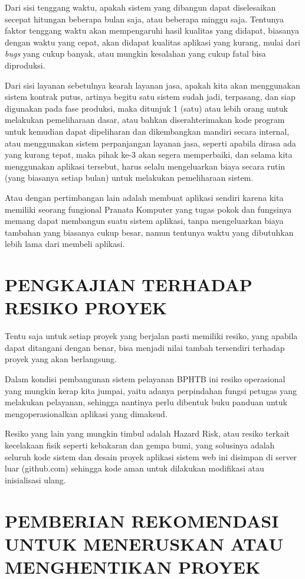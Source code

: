 \documentclass[pdftex,12pt, oneside]{article}
\begin{document}
Dari sisi tenggang waktu, apakah sistem yang dibangun dapat diselesaikan secepat hitungan beberapa bulan saja, atau beberapa minggu saja. Tentunya faktor tenggang waktu akan mempengaruhi hasil kualitas yang didapat, biasanya dengan waktu yang cepat, akan didapat kualitas aplikasi yang kurang, mulai dari \textit{bugs} yang cukup banyak, atau mungkin kesalahan yang cukup fatal bisa diproduksi.

Dari sisi layanan sebetulnya kearah layanan jasa, apakah kita akan menggunakan sistem kontrak putus, artinya begitu satu sistem sudah jadi, terpasang, dan siap digunakan pada fase produksi, maka ditunjuk 1 (satu) atau lebih orang untuk melakukan pemeliharaan dasar, atau bahkan diserahterimakan kode program untuk kemudian dapat dipeliharan dan dikembangkan mandiri secara internal, atau menggunakan sistem perpanjangan layanan jasa, seperti apabila dirasa ada yang kurang tepat, maka pihak ke-3 akan segera memperbaiki, dan selama kita menggunakan aplikasi tersebut, harus selalu mengeluarkan biaya secara rutin (yang biasanya setiap bulan) untuk melakukan pemeliharaan sistem.

Atau dengan pertimbangan lain adalah membuat aplikasi sendiri karena kita memiliki seorang fungional Pranata Komputer yang tugas pokok dan fungsinya memang dapat membangun suatu sistem aplikasi, tanpa mengeluarkan biaya tambahan yang biasanya cukup besar, namun tentunya waktu yang dibutuhkan lebih lama dari membeli aplikasi.



\section{PENGKAJIAN TERHADAP RESIKO PROYEK}

Tentu saja untuk setiap proyek yang berjalan pasti memiliki resiko, yang apabila dapat ditangani dengan benar, bisa menjadi nilai tambah tersendiri terhadap proyek yang akan berlangsung.

Dalam kondisi pembangunan sistem pelayanan BPHTB ini resiko operasional yang mungkin kerap kita jumpai, yaitu adanya perpindahan fungsi petugas yang melakukan pelayanan, sehingga nantinya perlu dibentuk buku panduan untuk mengoperasionalkan aplikasi yang dimaksud.

Resiko yang lain yang mungkin timbul adalah Hazard Risk, atau resiko terkait kecelakaan fisik seperti kebakaran dan gempa bumi, yang solusinya adalah seluruh kode sistem dan desain proyek aplikasi sistem web ini disimpan di server luar (github.com) sehingga kode aman untuk dilakukan modifikasi atau inisialisasi ulang.

\section{PEMBERIAN REKOMENDASI UNTUK MENERUSKAN ATAU MENGHENTIKAN PROYEK}
\end{document}
